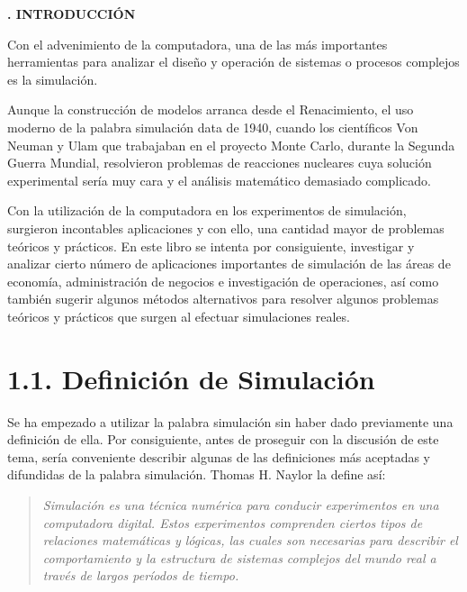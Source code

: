 \documentclass[11pt,letterpaper]{report}
\begin{document}
\begin{center}
{\LARGE\bfseries\linespread{1.3}. INTRODUCCIÓN\par}
\end{center}
\vspace{0.5cm}

\setcounter{chapter}{1}
\setcounter{page}{11}

Con el advenimiento de la computadora, una de las más importantes
herramientas para analizar el diseño y operación de sistemas o procesos
complejos es la simulación.

Aunque la construcción de modelos arranca desde el Renacimiento, el uso
moderno de la palabra simulación data de 1940, cuando los científicos
Von Neuman y Ulam que trabajaban en el proyecto Monte Carlo, durante la
Segunda Guerra Mundial, resolvieron problemas de reacciones nucleares
cuya solución experimental sería muy cara y el análisis matemático
demasiado complicado.

Con la utilización de la computadora en los experimentos de simulación,
surgieron incontables aplicaciones y con ello, una cantidad mayor de
problemas teóricos y prácticos. En este libro se intenta por
consiguiente, investigar y analizar cierto número de aplicaciones
importantes de simulación de las áreas de economía, administración de
negocios e investigación de operaciones, así como también sugerir
algunos métodos alternativos para resolver algunos problemas teóricos y
prácticos que surgen al efectuar simulaciones reales.

\section*{1.1. Definición de Simulación}

Se ha empezado a utilizar la palabra simulación sin haber dado
previamente una definición de ella. Por consiguiente, antes de proseguir
con la discusión de este tema, sería conveniente describir algunas de
las definiciones más aceptadas y difundidas de la palabra simulación.
Thomas H. Naylor la define así:

\begin{quote}
\emph{Simulación es una técnica numérica para conducir experimentos en
una computadora digital. Estos experimentos comprenden ciertos tipos de
relaciones matemáticas y lógicas, las cuales son necesarias para
describir el comportamiento y la estructura de sistemas complejos del
mundo real a través de largos períodos de tiempo.}
\end{quote}
\end{document}
